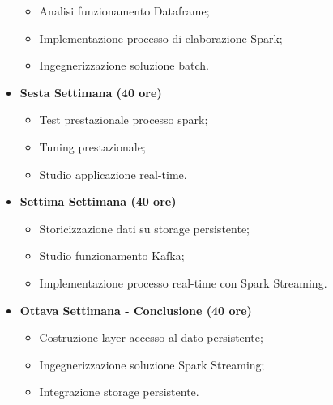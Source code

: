 \begin{itemize}
\begin{itemize}
		\item Analisi funzionamento Dataframe;
		\item Implementazione processo di elaborazione Spark;
		\item Ingegnerizzazione soluzione batch.
	\end{itemize}
	\item[] \textbf{Sesta Settimana (40 ore)} 
	\begin{itemize}
		\item Test prestazionale processo spark;
		\item Tuning prestazionale;
		\item Studio applicazione real-time.
	\end{itemize}
	\item[] \textbf{Settima Settimana (40 ore)} 
	\begin{itemize}
		\item Storicizzazione dati su storage persistente;
		\item Studio funzionamento Kafka;
		\item Implementazione processo real-time con Spark Streaming.
	\end{itemize}
	\item[] \textbf{Ottava Settimana - Conclusione (40 ore)} 
	\begin{itemize}
		\item Costruzione layer accesso al dato persistente;
		\item Ingegnerizzazione soluzione Spark Streaming;
		\item Integrazione storage persistente.
	\end{itemize}
\end{itemize}
